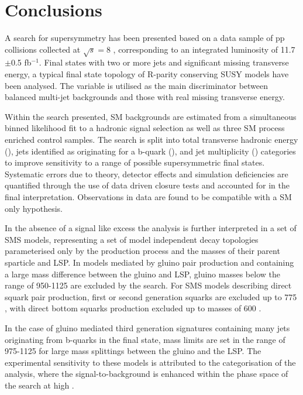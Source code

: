 \chapter{Conclusions}
\label{chap:conclusions}

A search for supersymmetry has been presented based on a data sample of pp collisions collected at $\sqrt{s} = 8$ \TeV, corresponding to an integrated luminosity of 11.7$\pm$0.5 fb$^{-1}$. Final states with two or more jets and significant missing transverse energy, a typical final state topology of R-parity conserving \ac{SUSY} models have been analysed. The \alphat variable is utilised as the main discriminator between balanced multi-jet backgrounds and those with real missing transverse energy. 

Within the search presented, \acf{SM} backgrounds are estimated from a simultaneous binned likelihood fit to a hadronic signal selection as well as three \ac{SM} process enriched control samples. The search is split into total transverse hadronic energy (\theht), jets identified as originating for a b-quark (\nbreco), and jet multiplicity (\njet) categories to improve sensitivity to a range of possible supersymmetric final states. Systematic errors due to theory, detector effects and simulation deficiencies are quantified through the use of data driven closure tests and accounted for in the final interpretation. Observations in data are found to be compatible with a \ac{SM} only hypothesis. 

In the absence of a signal like excess the analysis is further interpreted in a set of \acf{SMS} models, representing a set of model independent decay topologies parameterised only by the production process and the masses of their parent sparticle and \acf{LSP}. In models mediated by gluino pair production and containing a large mass difference between the gluino and \ac{LSP}, gluino masses below the range of 950-1125 \GeV are excluded by the \alphat search. For \ac{SMS} models describing direct squark pair production, first or second generation squarks are excluded up to 775 \GeV, with direct bottom squarks production excluded up to masses of 600 \GeV. 

In the case of gluino mediated third generation signatures containing many jets originating from b-quarks in the final state, mass limits are set in the range of 975-1125 \GeV for large mass splittings between the gluino and the \ac{LSP}. The experimental sensitivity to these models is attributed to the \nbreco categorisation of the analysis, where the signal-to-background is enhanced within the phase space of the search at high \nbreco.

